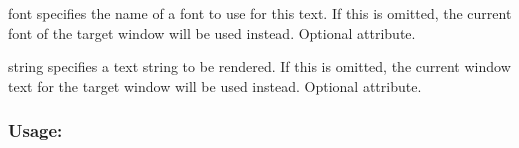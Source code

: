 \begin{DoxyItemize}
\item {\ttfamily font} specifies the name of a font to use for this text. If this is omitted, the current font of the target window will be used instead. Optional attribute. \item {\ttfamily string} specifies a text string to be rendered. If this is omitted, the current window text for the target window will be used instead. Optional attribute.\end{DoxyItemize}
\hypertarget{fal_element_ref_fal_elem_ref_sec_31_3}{}\subsubsection{Usage\+:}\label{fal_element_ref_fal_elem_ref_sec_31_3}

